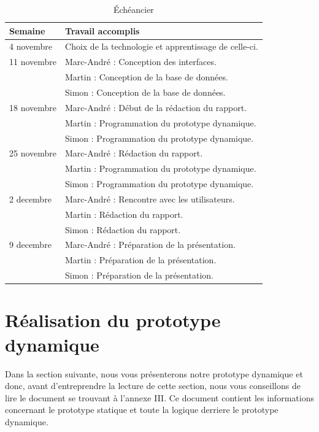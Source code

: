 \documentclass[letterpaper, oneside, 12pt, these, creativecommons]{thETS}
\begin{document}
\begin{table}
	\centering
	\begin{tabular}{|l|l|}
		\hline
		Semaine	& Travail accomplis 								\\ \hline
		4 novembre	& Choix de la technologie et apprentissage de celle-ci.		\\ \hline
		11 novembre	& Marc-André : Conception des interfaces. 				\\
				& Martin : Conception de la base de données.				\\
				& Simon : Conception de la base de données.				\\ \hline
		18 novembre	& Marc-André : Début de la rédaction du rapport. 			\\ 
				& Martin : Programmation du prototype dynamique. 			\\
				& Simon : Programmation du prototype dynamique. 			\\ \hline
		25 novembre	& Marc-André : Rédaction du rapport.		 			\\
				& Martin : Programmation du prototype dynamique. 			\\ 
				& Simon : Programmation du prototype dynamique.		 	\\ \hline
		2 decembre	& Marc-André : Rencontre avec les utilisateurs. 			\\
				& Martin : Rédaction du rapport.						\\
				& Simon : Rédaction du rapport.						\\ \hline
		9 decembre	& Marc-André : Préparation de la présentation.	 		\\ 
				& Martin : Préparation de la présentation.	 			\\ 
				& Simon : Préparation de la présentation.	 			\\ \hline
	\end{tabular}
	\caption{Échéancier}
\end{table}

\chapter{Réalisation du prototype dynamique}

Dans la section suivante, nous vous présenterons notre prototype dynamique et donc, avant d'entreprendre la lecture de cette section, nous vous conseillons de lire le document se trouvant à l'annexe III. Ce document contient les informations concernant le prototype statique et toute la logique derriere le prototype dynamique.
\end{document}
